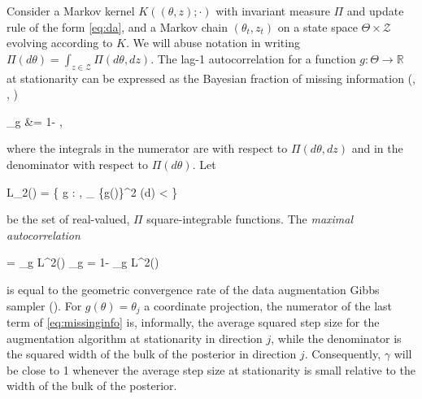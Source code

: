 \documentclass[11pt]{article}
\newcommand{\be}{\begin{equs}}
\newcommand{\ee}{\end{equs}}
\newcommand{\bb}[1]{\mathbb{#1}}
\newcommand{\mc}[1]{\mathcal{#1}}
\newcommand{\var}{\text{var}}
\begin{document}
Consider a Markov kernel $K((\theta,z);\cdot)$ with invariant measure $\Pi$ and update rule of the form \eqref{eq:da}, and a Markov chain $(\theta_t,z_t)$ on a state space $\Theta \times \mc Z$ evolving according to $K$. We will abuse notation in writing $\Pi(d\theta) = \int_{z \in \mc Z} \Pi(d\theta,dz)$. The lag-1 autocorrelation for a function $g : \Theta \to \bb R$ at stationarity can be expressed as the Bayesian fraction of missing information (\cite{papaspiliopoulos2007general}, \cite{rubin2004multiple}, \cite{liu1994fraction})
\be
\gamma_g &= 1- \frac{\bb E[\var(g(\theta) \mid z)]}{\var(g(\theta))}, \label{eq:missinginfo}
\ee
where the integrals in the numerator are with respect to $\Pi(d\theta,dz)$ and in the denominator with respect to $\Pi(d\theta)$. Let 
\be
L_2(\Pi) = \left\{ g : \Theta \to \bb R, \int_{\theta \in \Theta} \{g(\theta)\}^2 \Pi(d\theta) < \infty \right\} 
\ee
be the set of real-valued, $\Pi$ square-integrable functions. The \emph{maximal autocorrelation}
\be
\gamma = \sup_{g \in L^2(\Pi)} \gamma_g = 1- \inf_{g \in L^2(\Pi)} \frac{\bb E[\var(g(\theta) \mid z)]}{\var(g(\theta))}
\ee
is equal to the geometric convergence rate of the data augmentation Gibbs sampler (\cite{liu1994fraction}). For $g(\theta) = \theta_j$ a coordinate projection, the numerator of the last term of \eqref{eq:missinginfo} is, informally, the average squared step size for the augmentation algorithm at stationarity in direction $j$, while the denominator is the squared width of the bulk of the posterior in direction $j$. Consequently, $\gamma$ will be close to 1 whenever the average step size at stationarity is small relative to the width of the bulk of the posterior. 
\end{document}
